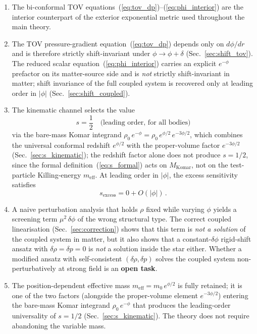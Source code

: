 \documentclass[11pt]{article}
\begin{document}
\begin{enumerate}
\item The bi-conformal TOV equations~(\ref{eq:tov_dp})--(\ref{eq:phi_interior})
  are the interior counterpart of the exterior exponential
  metric used throughout the main theory.

\item The TOV pressure-gradient equation~(\ref{eq:tov_dp})
  depends only on $d\phi/dr$ and is therefore strictly
  shift-invariant under $\phi\to\phi+\delta$
  (Sec.~\ref{sec:shift_tov}).  The reduced scalar
  equation~(\ref{eq:phi_interior}) carries an explicit
  $e^{-\phi}$ prefactor on its matter-source side and
  is \emph{not} strictly shift-invariant in matter; shift
  invariance of the full coupled system is recovered only
  at leading order in $|\phi|$ (Sec.~\ref{sec:shift_coupled}).

\item The kinematic channel selects the value
  \begin{equation}
    s = \frac{1}{2}\quad\text{(leading order, for all
    bodies)}
  \end{equation}
  via the bare-mass Komar integrand
  $\rho_0\,e^{-\phi} = \rho_0\,e^{\phi/2}\,e^{-3\phi/2}$,
  which combines the universal conformal redshift
  $e^{\phi/2}$ with the proper-volume factor $e^{-3\phi/2}$
  (Sec.~\ref{sec:s_kinematic}); the redshift factor alone
  does not produce $s=1/2$, since the formal
  definition~(\ref{eq:s_formal}) acts on $M_{\mathrm{Komar}}$,
  not on the test-particle Killing-energy
  $m_{\mathrm{eff}}$.  At leading order in $|\phi|$, the
  excess sensitivity satisfies
  \begin{equation}
    s_{\mathrm{excess}} = 0 + O(|\phi|)\,.
  \end{equation}

\item A naive perturbation analysis that holds $\rho$
  fixed while varying $\phi$ yields a screening term
  $\mu^2\,\delta\phi$ of the wrong structural type.  The
  correct coupled linearisation (Sec.~\ref{sec:correction})
  shows that this term is \emph{not a solution} of the
  coupled system in matter, but it also shows that a
  constant-$\delta\phi$ rigid-shift ansatz with
  $\delta\rho = \delta p = 0$ is \emph{not} a solution
  inside the star either.  Whether a modified ansatz
  with self-consistent $(\delta\rho,\delta p)$ solves the
  coupled system non-perturbatively at strong field is
  an \textbf{open task}.

\item The position-dependent effective mass
  $m_{\mathrm{eff}} = m_0\,e^{\phi/2}$ is fully retained;
  it is one of the two factors (alongside the
  proper-volume element $e^{-3\phi/2}$) entering the
  bare-mass Komar integrand $\rho_0\,e^{-\phi}$ that
  produces the leading-order universality of $s=1/2$
  (Sec.~\ref{sec:s_kinematic}).  The theory does not
  require abandoning the
  variable mass.


\end{enumerate}
\end{document}
